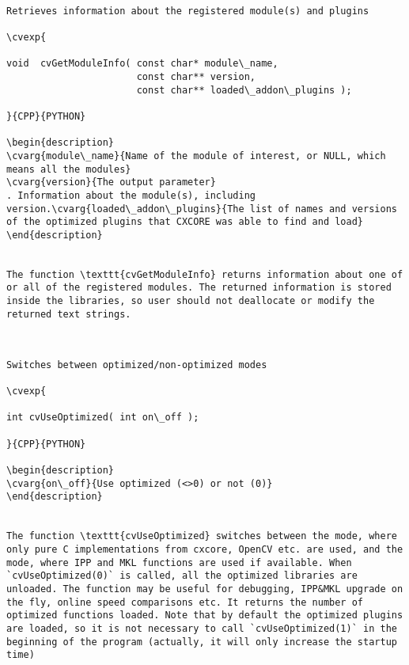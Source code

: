 \begin{verbatim}

Retrieves information about the registered module(s) and plugins

\cvexp{

void  cvGetModuleInfo( const char* module\_name,
                       const char** version,
                       const char** loaded\_addon\_plugins );

}{CPP}{PYTHON}

\begin{description}
\cvarg{module\_name}{Name of the module of interest, or NULL, which means all the modules}
\cvarg{version}{The output parameter}
. Information about the module(s), including version.\cvarg{loaded\_addon\_plugins}{The list of names and versions of the optimized plugins that CXCORE was able to find and load}
\end{description}


The function \texttt{cvGetModuleInfo} returns information about one of or all of the registered modules. The returned information is stored inside the libraries, so user should not deallocate or modify the returned text strings.


\end{verbatim}
\begin{verbatim}

Switches between optimized/non-optimized modes

\cvexp{

int cvUseOptimized( int on\_off );

}{CPP}{PYTHON}

\begin{description}
\cvarg{on\_off}{Use optimized (<>0) or not (0)}
\end{description}


The function \texttt{cvUseOptimized} switches between the mode, where only pure C implementations from cxcore, OpenCV etc. are used, and the mode, where IPP and MKL functions are used if available. When `cvUseOptimized(0)` is called, all the optimized libraries are unloaded. The function may be useful for debugging, IPP&MKL upgrade on the fly, online speed comparisons etc. It returns the number of optimized functions loaded. Note that by default the optimized plugins are loaded, so it is not necessary to call `cvUseOptimized(1)` in the beginning of the program (actually, it will only increase the startup time)


\end{verbatim}
